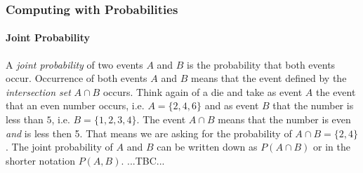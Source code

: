 








\subsubsection{Computing with Probabilities}


\paragraph{Joint Probability}
A \emph{joint probability} of two events $A$ and $B$ is the probability that both events occur. Occurrence of both events $A$ and $B$ means that the event defined by the \emph{intersection set} $A \cap B$ occurs. Think again of a die and take as event $A$ the event that an even number occurs, i.e. $A = \{2,4,6\}$ and as event $B$ that the number is less than $5$, i.e. $B = \{1,2,3,4\}$. The event $A \cap B$ means that the number is even \emph{and} is less then 5. That means we are asking for the probability of $A \cap B = \{2,4\}$. The joint probability of $A$ and $B$ can be written down as $P(A \cap B)$ or in the shorter notation $P(A,B)$. ...TBC...




